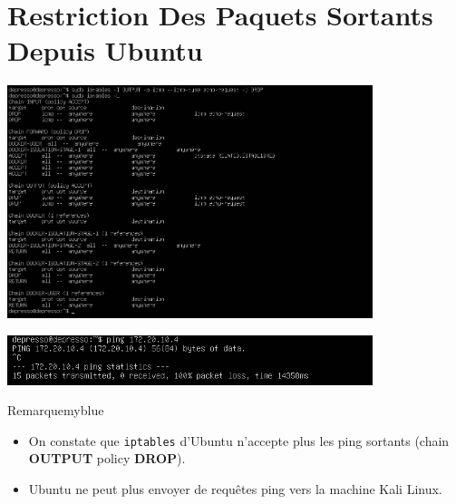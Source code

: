 \newpage
\section{Restriction Des Paquets Sortants Depuis Ubuntu}

\begin{center}
    \includegraphics[width=0.8\textwidth]{Question/SC/ip_2.PNG}
\end{center}

\vspace{0.25cm}

\begin{center}
    \includegraphics[width=0.8\textwidth]{Question/SC/Capture.PNG}
\end{center}

\vspace{0.35cm}

\begin{prettyBox}{Remarque}{myblue}
\begin{itemize}
    \item On constate que \texttt{iptables} d’Ubuntu n’accepte plus les ping sortants (chain \textbf{OUTPUT} policy \textbf{DROP}).
    \item Ubuntu ne peut plus envoyer de requêtes ping vers la machine Kali Linux.
\end{itemize}
\end{prettyBox}

